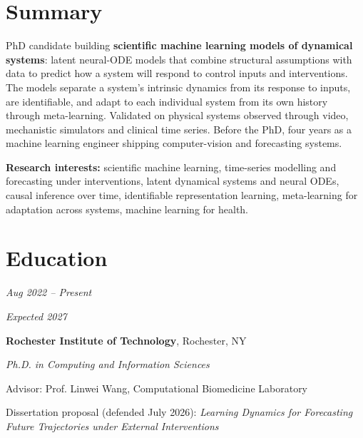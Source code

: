 \documentclass[10pt, letterpaper]{article}
\begin{document}
    

    \vspace{0.3 cm - 0.3 cm}


    \section{Summary}
    \begin{onecolentry}
        PhD candidate building \textbf{scientific machine learning models of dynamical systems}: latent
        neural-ODE models that combine structural assumptions with data to predict how a system will respond to
        control inputs and interventions. The models separate a system's intrinsic dynamics from its response to
        inputs, are identifiable, and adapt to each individual system from its own history through
        meta-learning. Validated on physical systems observed through video, mechanistic simulators and clinical
        time series. Before the PhD, four years as a machine learning engineer shipping computer-vision and
        forecasting systems.
    \end{onecolentry}

    \vspace{0.2 cm}

    \begin{onecolentry}
        \textbf{Research interests:} scientific machine learning, time-series modelling and forecasting under
        interventions, latent dynamical systems and neural ODEs, causal inference over time, identifiable
        representation learning, meta-learning for adaptation across systems, machine learning for health.
    \end{onecolentry}


    \section{Education}
    \begin{twocolentry}{
        \textit{Aug 2022 – Present}

        \textit{Expected 2027}}
        \textbf{Rochester Institute of Technology}, Rochester, NY

        \textit{Ph.D. in Computing and Information Sciences}
    \end{twocolentry}

    \vspace{0.10 cm}
    \begin{onecolentry}
        \begin{highlights}
            \item Advisor: Prof. Linwei Wang, Computational Biomedicine Laboratory
            \item Dissertation proposal (defended July 2026): \textit{Learning Dynamics for Forecasting Future
            Trajectories under External Interventions}
        \end{highlights}
    \end{onecolentry}
\end{document}
